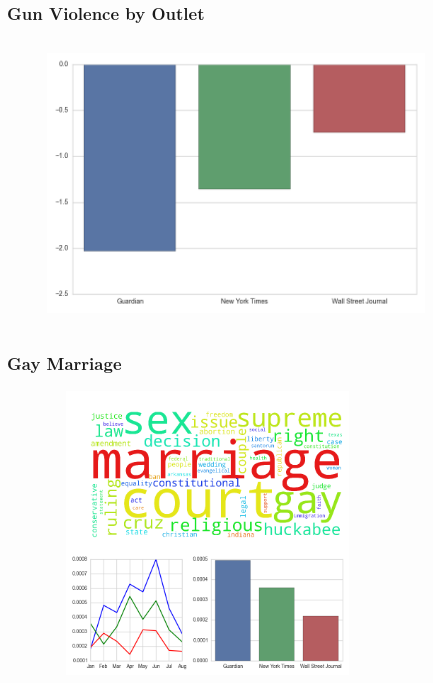 \documentclass[11pt]{beamer}
\begin{document}
\begin{frame}
\frametitle{Gun Violence by Outlet}

\begin{figure}
\centering
\includegraphics[width=100mm,height=75mm]{figures/source_sentiment_topic1.png}
\end{figure} 

\end{frame}


\begin{frame}
\frametitle{Gay Marriage}

\begin{figure}
\centering
\includegraphics[width=85mm,height=75mm]{figures/source_topic14.png}
\end{figure} 

\end{frame}

\end{document}
